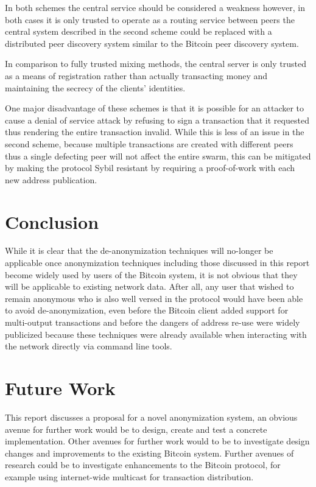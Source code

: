 In both schemes the central service should be considered a weakness however, in both cases it is only trusted to operate as a routing service between peers the central system described in the second scheme could be replaced with a distributed peer discovery system similar to the Bitcoin peer discovery system.

In comparison to fully trusted mixing methods, the central server is only trusted as a means of registration rather than actually transacting money and maintaining the secrecy of the clients' identities.

One major disadvantage of these schemes is that it is possible for an attacker to cause a denial of service attack by refusing to sign a transaction that it requested thus rendering the entire transaction invalid.  While this is less of an issue in the second scheme, because multiple transactions are created with different peers thus a single defecting peer will not affect the entire swarm, this can be mitigated by making the protocol Sybil\cite{sybil} resistant by requiring a proof-of-work with each new address publication.

\section{Conclusion}
While it is clear that the de-anonymization techniques will no-longer be applicable once anonymization techniques including those discussed in this report become widely used by users of the Bitcoin system, it is not obvious that they will be applicable to existing network data. After all, any user that wished to remain anonymous who is also well versed in the protocol would have been able to avoid de-anonymization, even before the Bitcoin client\cite{bitcoin-qt} added support for multi-output transactions and before the dangers of address re-use were widely publicized because these techniques were already available when interacting with the network directly via command line tools.

\section{Future Work}
This report discusses a proposal for a novel anonymization system, an obvious avenue for further work would be to design, create and test a concrete implementation. Other avenues for further work would to be to investigate design changes and improvements to the existing Bitcoin system.  Further avenues of research could be to investigate enhancements to the Bitcoin protocol, for example using internet-wide multicast for transaction distribution.

